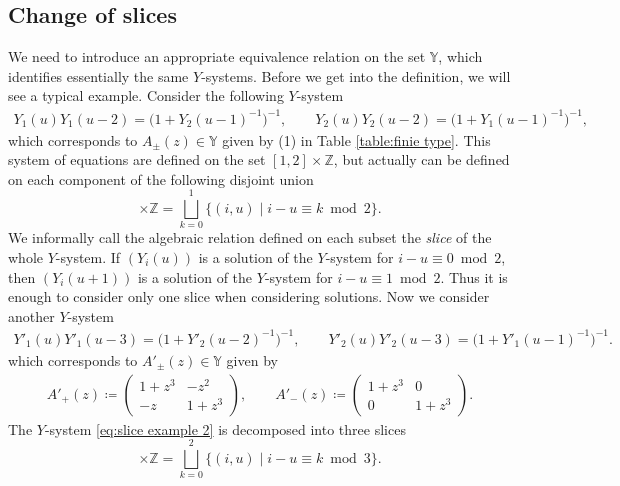 \documentclass[10pt,a4paper]{amsart}
\numberwithin{equation}{section}
\theoremstyle{definition}
\begin{document}
\subsection{Change of slices}\label{section:change of slice}
We need to introduce an appropriate equivalence relation on the set $\mathbb{Y}$,
which identifies essentially the same $Y$-systems.
Before we get into the definition, we will see a typical example.
Consider the following $Y$-system
\begin{gather}\label{eq:slice example 1}
 Y_1 (u) Y_1 (u - 2) = \bigl(1 + Y_2(u-1)^{-1}\bigr)^{-1},\qquad Y_2 (u) Y_2 (u - 2) = \bigl(1 + Y_1(u-1)^{-1}\bigr)^{-1},
\end{gather}
which corresponds to $A_\pm (z) \in \mathbb{Y}$ given by (1) in Table \ref{table:finie type}.
This system of equations are defined on the set $[1,2] \times \mathbb{Z}$, but
actually can be defined on each component of the following disjoint union
\begin{equation*}
 [1,2] \times \mathbb{Z} = \bigsqcup_{k=0}^1 \{ (i, u) \mid i-u \equiv k \bmod 2 \}.
\end{equation*}
We informally call the algebraic relation defined on each subset
the \emph{slice} of the whole $Y$-system.
If $(Y_i(u))$ is a solution of the $Y$-system for $i-u \equiv 0 \bmod 2$,
then $(Y_i(u+1))$ is a solution of the $Y$-system for $i-u \equiv 1 \bmod 2$.
Thus it is enough to consider only one slice when considering solutions.
Now we consider another $Y$-system
\begin{gather}\label{eq:slice example 2}
Y'_1 (u) Y'_1 (u - 3) = \bigl(1 + Y'_2(u-2)^{-1}\bigr)^{-1},\qquad
 Y'_2 (u) Y'_2 (u - 3) = \bigl(1 + Y'_1(u-1)^{-1}\bigr)^{-1}.
\end{gather}
which corresponds to $A'_\pm (z) \in \mathbb{Y}$ given by
\begin{align*}
 A'_+(z)\coloneqq
 \begin{pmatrix}
 1 + z^3 & -z^2 \\
 -z & 1 + z^3
 \end{pmatrix},\qquad
 A'_-(z) \coloneqq
 \begin{pmatrix}
 1 + z^3 & 0 \\
 0 & 1 + z^3
 \end{pmatrix}.
\end{align*}
The $Y$-system \eqref{eq:slice example 2} is decomposed into three slices
\begin{equation*}
 [1,2] \times \mathbb{Z} =
 \bigsqcup_{k=0}^2 \{ (i, u) \mid i - u \equiv k \bmod 3 \}.
\end{equation*}
\end{document}
